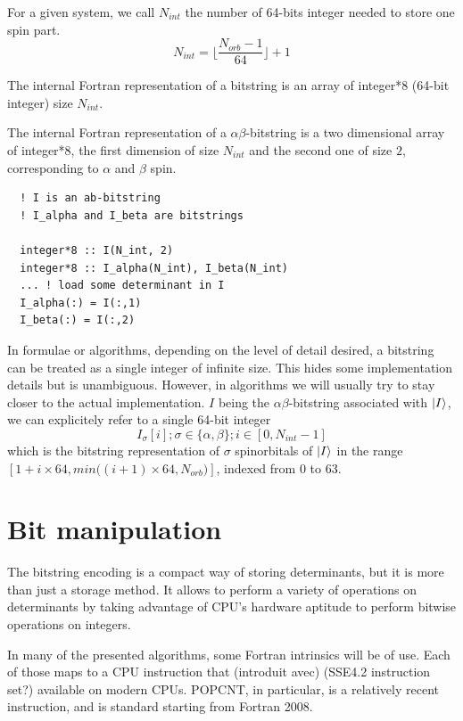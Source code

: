 For a given system, we call $N_{int}$ the number of 64-bits integer needed to store one spin part.
\begin{equation}
N_{int} = \big \lfloor \frac{N_{orb}-1}{64} \big \rfloor + 1
\end{equation}


The internal Fortran representation of a bitstring is an array of integer*8 (64-bit integer) size $N_{int}$.

The internal Fortran representation of a $\alpha \beta$-bitstring is a two dimensional array of integer*8, the first dimension of size $N_{int}$ and the second one of size $2$, corresponding to $\alpha$ and $\beta$ spin.


\begin{lstlisting}
  ! I is an ab-bitstring
  ! I_alpha and I_beta are bitstrings
  
  integer*8 :: I(N_int, 2)
  integer*8 :: I_alpha(N_int), I_beta(N_int)
  ... ! load some determinant in I
  I_alpha(:) = I(:,1)
  I_beta(:) = I(:,2)
\end{lstlisting}

       

      
In formulae or algorithms, depending on the level of detail desired, a bitstring can be treated as a single integer of infinite size. This hides some implementation details but is unambiguous. However, in algorithms we will usually try to stay closer to the actual implementation. $I$ being the $\alpha \beta$-bitstring associated with $\ket I$, we can explicitely refer to a single 64-bit integer
$$I_{\sigma}[i] ; \sigma \in \{\alpha, \beta\} ; i \in [0, N_{int}-1]$$
which is the bitstring representation of $\sigma$ spinorbitals of $\ket I$ in the range $[1+i \times 64, min \big ( (i+1) \times 64, N_{orb} \big )]$, indexed from $0$ to $63$.

      
\section{Bit manipulation}

The bitstring encoding is a compact way of storing determinants, but it is more than just a storage method. It allows to perform a variety of operations on determinants by taking advantage of CPU's hardware aptitude to perform bitwise operations on integers.

In many of the presented algorithms, some Fortran intrinsics will be of use. Each of those maps to a CPU instruction that (introduit avec) (SSE4.2 instruction set?) available on modern CPUs. POPCNT, in particular, is a relatively recent instruction, and is standard starting from Fortran 2008.
      
